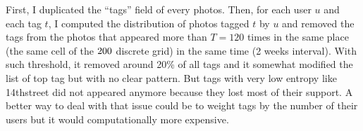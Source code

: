 First, I duplicated the \enquote{tags} field of every photos. Then, for each
user $u$ and each tag $t$, I computed the distribution of photos tagged $t$ by
$u$ and removed the tags from the photos that appeared more than $T=120$ times
in the same place (the same cell of the $200\time 200$ discrete grid) in the same
time (2 weeks interval). With such threshold, it removed around 20\% of all
tags and it somewhat modified the list of top tag but with no clear pattern.
But tags with very low entropy like \textsf{14thstreet} did not appeared
anymore because they lost most of their support. A better way to deal with
that issue could be to weight tags by the number of their users but it would
computationally more expensive.
